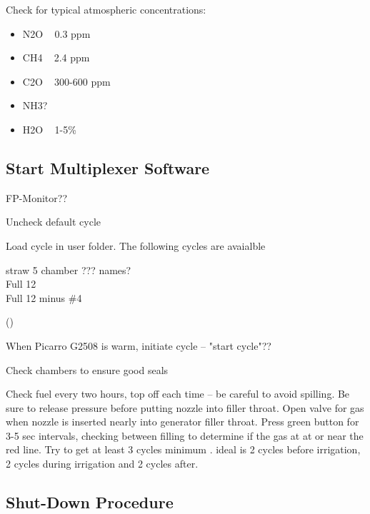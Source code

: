 \documentclass[12pt]{../SOP3}\usepackage[]{graphicx}\usepackage[]{color}
\begin{document}
\NP Check for typical atmospheric concentrations:
                                 
\begin{itemize}
\item N2O ~ 0.3 ppm
\item CH4 ~ 2.4 ppm
\item C2O ~ 300-600 ppm
\item NH3?
\item H2O ~ 1-5\%
\end{itemize}
                               
\subsection*{Start Multiplexer Software}

\NP FP-Monitor??
                               
\NP Uncheck default cycle
                               
\NP Load cycle in user folder. The following cycles are avaialble 

\begin{description}
  \item[straw 5 chamber ??? names?]
  \item[Full 12]
  \item[Full 12 minus \#4]
\end{description}
()
                               
\NP When Picarro G2508 is warm, initiate cycle -- "start cycle"??
                               
\NP Check chambers to ensure good seals
                               
\NP Check fuel every two hours, top off each time -- be careful to avoid spilling. Be sure to release pressure before putting nozzle into filler throat. Open valve for gas when nozzle is inserted nearly into generator filler throat. Press green button for 3-5 sec intervals, checking between filling to determine if the gas at at or near the red line.
                               Try to get at least 3 cycles minimum . ideal is 2 cycles before irrigation, 2 cycles during irrigation and 2 cycles after. 
                               
\subsection*{Shut-Down Procedure}
                               
\end{document}
